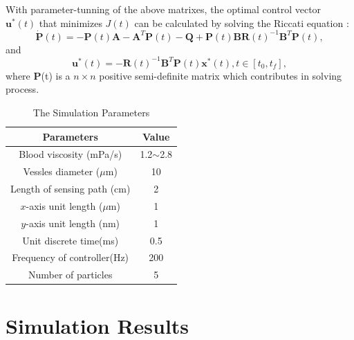 \documentclass[conference]{IEEEtran}
\begin{document}
With parameter-tunning of the above matrixes, the optimal control vector $\textbf{u}^{*}(t)$ that minimizes $J(t)$ can be calculated by solving the Riccati equation \cite{li2004iterative}: 
\begin{equation}
\label{eq10}
\dot{\textbf{P}}(t) = -\textbf{P}(t) \textbf{A} - \textbf{A}^{T} \textbf{P}(t) - \textbf{Q} + \textbf{P}(t) \textbf{B} \textbf{R}(t)^{-1}  \textbf{B}^{T} \textbf{P}(t),
\end{equation}
and
\begin{equation}
\label{eq11}
\textbf{u}^{*}(t) = -\textbf{R}(t)^{-1} \textbf{B}^{T}\textbf{P}(t) \textbf{x}^{*}(t)  ,t\in[t_{0},t_{f}],
\end{equation}
where $\textbf{P}$(t) is a $n\times n$ positive semi-definite matrix which contributes in solving process.


\begin{table}[h]
\captionsetup{labelformat=simple, textfont=sc}
\caption{ The Simulation Parameters }
\label {table0}

\normalsize
\centering
\begin{tabular}{|c|c|}
\hline
\textbf{Parameters}                  & \textbf{Value}        \\ \hline
Blood viscosity (mPa/s)     & 1.2$\sim$2.8 \\ \hline
Vessles diameter ($\mu$m)        & 10           \\ \hline
Length of sensing path (cm) & 2            \\ \hline
$x$-axis unit length ($\mu$m)      & 1            \\ \hline
$y$-axis unit length (nm)     & 1            \\ \hline
Unit discrete time(ms)      & 0.5          \\ \hline
Frequency of controller(Hz) & 200          \\ \hline
Number of particles         & 5            \\ \hline
\end{tabular}
\end{table}


\section{Simulation Results}
\end{document}
